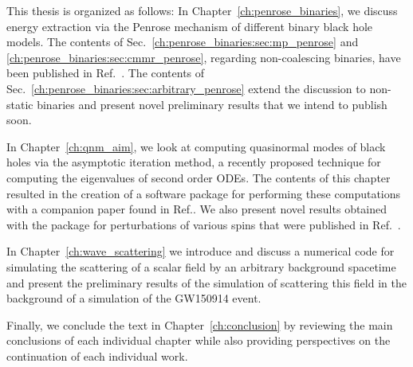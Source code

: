This thesis is organized as follows: In Chapter~\ref{ch:penrose_binaries}, we discuss energy extraction via the Penrose mechanism of different binary black hole models. The contents of Sec.~\ref{ch:penrose_binaries:sec:mp_penrose} and \ref{ch:penrose_binaries:sec:cmmr_penrose}, regarding non-coalescing binaries, have been published in Ref.~\cite{PhysRevD.104.124025}. The contents of Sec.~\ref{ch:penrose_binaries:sec:arbitrary_penrose} extend the discussion to non-static binaries and present novel preliminary results that we intend to publish soon.

In Chapter~\ref{ch:qnm_aim}, we look at computing quasinormal modes of black holes via the asymptotic iteration method, a recently proposed technique for computing the eigenvalues of second order ODEs. The contents of this chapter resulted in the creation of a software package for performing these computations with a companion paper found in Ref.\cite{Sanches2022}. We also present novel results obtained with the package for perturbations of various spins that were published in Ref.~\cite{Mamani2022}.

In Chapter~\ref{ch:wave_scattering} we introduce and discuss a numerical code for simulating the scattering of a scalar field by an arbitrary background spacetime and present the preliminary results of the simulation of scattering this field in the background of a simulation of the GW150914 event.

Finally, we conclude the text in Chapter~\ref{ch:conclusion} by reviewing the main conclusions of each individual chapter while also providing perspectives on the continuation of each individual work.
